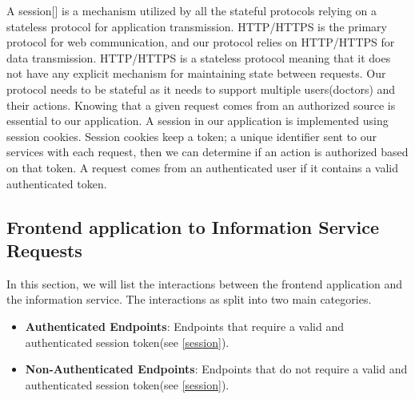 					A session[\cite{session-rfc6265}] is a mechanism utilized by all the stateful protocols relying on a stateless protocol for application transmission. 
					HTTP/HTTPS is the primary protocol for web communication, and our protocol relies on HTTP/HTTPS for data transmission. HTTP/HTTPS 
					is a stateless protocol meaning that it does not have any explicit mechanism for maintaining state between requests. Our protocol 
					needs to be stateful as it needs to support multiple users(doctors) and their actions. Knowing that a given request comes from an 
					authorized source is essential to our application. A session in our application is implemented using session cookies. Session cookies 
					keep a token; a unique identifier sent to our services with each request, then we can determine if an action is authorized based on that 
					token. A request comes from an authenticated user if it contains a valid authenticated token.

			\subsection{Frontend application to Information Service Requests}
				In this section, we will list the interactions between the frontend application and the information service. The interactions 
				as split into two main categories.
				\begin{itemize}
					\item \textbf{Authenticated Endpoints}: Endpoints that require a valid and authenticated session token(see \ref{session}).
					\item \textbf{Non-Authenticated Endpoints}: Endpoints that do not require a valid and authenticated session token(see \ref{session}).
				\end{itemize}
